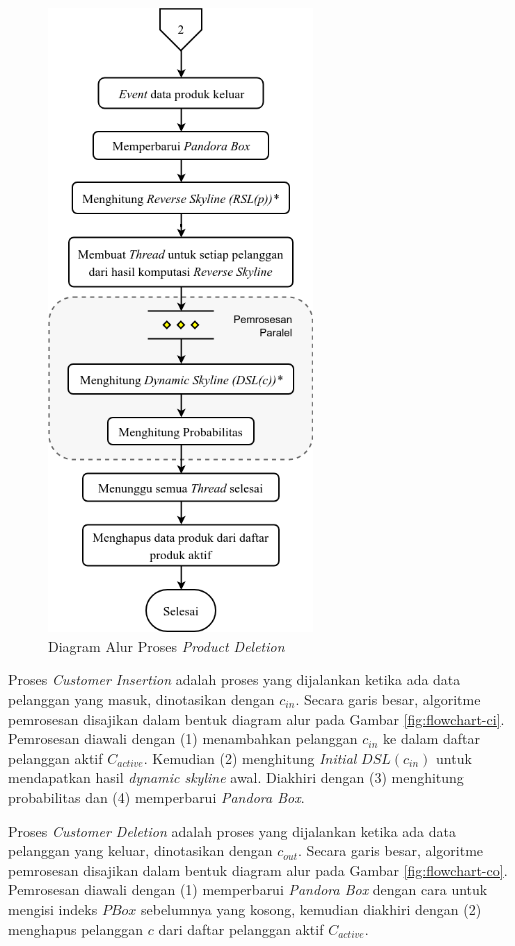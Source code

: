 \begin{figure}[H]
	\centering
	\includegraphics[width=7cm]{assets/img/bab3/flowchart-po.png}
	\caption{Diagram Alur Proses \textit{Product Deletion}}
	\label{fig:flowchart-po}
\end{figure}


Proses \textit{Customer Insertion} adalah proses yang dijalankan ketika ada data pelanggan yang masuk, dinotasikan dengan $c_{in}$. Secara garis besar, algoritme pemrosesan disajikan dalam bentuk diagram alur pada Gambar \ref{fig:flowchart-ci}. Pemrosesan diawali dengan (1) menambahkan pelanggan $c_{in}$ ke dalam daftar pelanggan aktif $C_{active}$. Kemudian (2) menghitung \textit{Initial} $DSL(c_{in})$ untuk mendapatkan hasil \textit{dynamic skyline} awal. Diakhiri dengan (3) menghitung probabilitas dan (4) memperbarui \textit{Pandora Box}.


Proses \textit{Customer Deletion} adalah proses yang dijalankan ketika ada data pelanggan yang keluar, dinotasikan dengan $c_{out}$. Secara garis besar, algoritme pemrosesan disajikan dalam bentuk diagram alur pada Gambar \ref{fig:flowchart-co}. Pemrosesan diawali dengan (1) memperbarui \textit{Pandora Box} dengan cara untuk mengisi indeks $PBox$ sebelumnya yang kosong, kemudian diakhiri dengan (2) menghapus pelanggan $c$ dari daftar pelanggan aktif $C_{active}$. 

